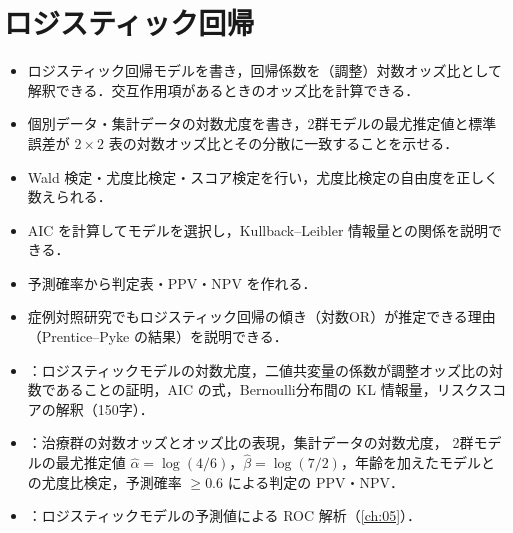 \chapter{ロジスティック回帰}\label{ch:06}

\begin{goalbox}
\begin{itemize}
\item ロジスティック回帰モデルを書き，回帰係数を（調整）対数オッズ比として解釈できる．交互作用項があるときのオッズ比を計算できる．
\item 個別データ・集計データの対数尤度を書き，2群モデルの最尤推定値と標準誤差が $2\times2$ 表の対数オッズ比とその分散に一致することを示せる．
\item Wald 検定・尤度比検定・スコア検定を行い，尤度比検定の自由度を正しく数えられる．
\item AIC を計算してモデルを選択し，Kullback--Leibler 情報量との関係を説明できる．
\item 予測確率から判定表・PPV・NPV を作れる．
\item 症例対照研究でもロジスティック回帰の傾き（対数OR）が推定できる理由（Prentice--Pyke の結果）を説明できる．
\end{itemize}
\end{goalbox}

\begin{exambox}
\begin{itemize}
\item {}：ロジスティックモデルの対数尤度，二値共変量の係数が調整オッズ比の対数であることの証明，AIC の式，Bernoulli分布間の KL 情報量，リスクスコアの解釈（150字）．
\item {}：治療群の対数オッズとオッズ比の表現，集計データの対数尤度，
      2群モデルの最尤推定値 $\hat\alpha=\log(4/6)$，$\hat\beta=\log(7/2)$，年齢を加えたモデルとの尤度比検定，予測確率 $\ge0.6$ による判定の PPV・NPV．
\item {}：ロジスティックモデルの予測値による ROC 解析（\cref{ch:05}）．
\end{itemize}
\end{exambox}


